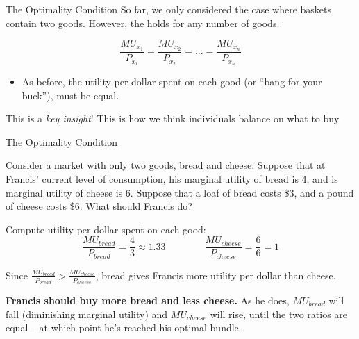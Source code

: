\documentclass{beamer}
\begin{document}
\begin{frame}{The Optimality Condition}
  So far, we only considered the case where baskets contain two goods. However, the  holds for any number of goods.

  $$
    \frac{MU_{x_1}}{P_{x_1}}=\frac{MU_{x_2}}{P_{x_2}}=...=\frac{MU_{x_n}}{P_{x_n}}
  $$

  \begin{itemize}
    \item As before, the utility per dollar spent on each good (or ``bang for your buck''), must be equal.
  \end{itemize}

  \bigskip
  \begin{center}
    This is a \emph {key insight}! This  is how we think individuals balance  on what to buy
  \end{center}
\end{frame}

\begin{frame}{The Optimality Condition}

  \bigskip
  Consider a market with only two goods, bread and cheese. Suppose that at Francis' current level of consumption, his marginal utility of bread is 4, and is marginal utility of cheese is 6. Suppose that a loaf of bread costs \$3, and a pound of cheese costs \$6. What should Francis do?

\end{frame}

\begin{frame}

  \bigskip
  Compute utility per dollar spent on each good:
  $$
    \frac{MU_{bread}}{P_{bread}} = \frac{4}{3} \approx 1.33
    \qquad\qquad
    \frac{MU_{cheese}}{P_{cheese}} = \frac{6}{6} = 1
  $$

  \bigskip
  Since $\frac{MU_{bread}}{P_{bread}} > \frac{MU_{cheese}}{P_{cheese}}$, bread gives Francis more utility per dollar than cheese.

  \bigskip
  \textbf{Francis should buy more bread and less cheese.} As he does, $MU_{bread}$ will fall (diminishing marginal utility) and $MU_{cheese}$ will rise, until the two ratios are equal -- at which point he's reached his optimal bundle.
\end{frame}
\end{document}
